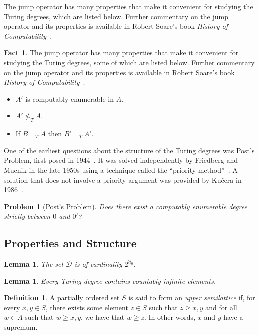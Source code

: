 \documentclass[psamsfonts]{amsart}
\newtheorem{lem}[thm]{Lemma}
\newtheorem{prob}[thm]{Problem}
\theoremstyle{definition}
\newtheorem{defn}[thm]{Definition}
\newtheorem{fact}[thm]{Fact}
\theoremstyle{remark}
\numberwithin{equation}{section}
\begin{document}
The jump operator has many properties that make it convenient for studying the
Turing degrees, which are listed below. Further commentary on the jump operator
and its properties is available in Robert Soare's book \emph{History of Computability}~\cite{soare16_turin_comput}.
\begin{fact}
  The jump operator has many properties that make it convenient for studying the
Turing degrees, some of which are listed below. Further commentary on the jump operator
and its properties is available in Robert Soare's book \emph{History of Computability}~\cite{soare16_turin_comput}.
  \begin{itemize}
  \item $A'$ is computably enumerable in $A$.
  \item $A' \not\leq_T A$.
  \item If $B=_TA$ then $B'=_TA'$.
  \end{itemize}
\end{fact}

One of the earliest questions about the structure of the Turing degrees was
Post's Problem, first posed in 1944~\cite{post44:_recur}. It was solved
independently by Friedberg and Mucnik in the late 1950s using a technique
called the ``priority method''~\cite{Friedberg236, muchnik1956unsolvability}. A solution that does not
involve a priority argument was provided by Ku\v{c}era in 1986~\cite{Kucera:1986:APS:22416.22462}.

\begin{prob}[Post's Problem]  
  Does there exist a computably enumerable degree strictly between $0$ and $0'$?
\end{prob}

\subsection{Properties and Structure}
\begin{lem}
  The set $\mathcal{D}$ is of cardinality $2^{\aleph_0}$.
\end{lem}

\begin{lem}
  Every Turing degree contains countably infinite elements.
\end{lem}

\begin{defn}
  A partially ordered set $S$ is said to form an \emph{upper semilattice} if, for every
 $x,y\in S$, there exists some element $z\in S$ such that $z \geq x,y$ and
 for all $w\in A$ such that $w\geq x,y$, we have that $w \geq z$. In other
 words, $x$ and $y$ have a supremum.
\end{defn}
\end{document}
